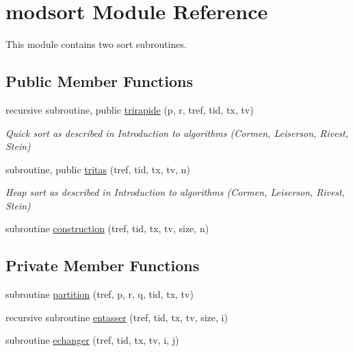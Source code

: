 \hypertarget{classmodsort}{\section{modsort Module Reference}
\label{classmodsort}
}


This module contains two sort subroutines.  


\subsection*{Public Member Functions}
\begin{DoxyCompactItemize}
\item 
recursive subroutine, public \hyperlink{classmodsort_a9c9ed3d1f948bf7023476506e298e0bf}{trirapide} (p, r, tref, tid, tx, tv)
\begin{DoxyCompactList}\small\item\em Quick sort as described in Introduction to algorithms (Cormen, Leiserson, Rivest, Stein) \end{DoxyCompactList}\item 
subroutine, public \hyperlink{classmodsort_a22712b17a572f1af3a89bb0247b6616c}{tritas} (tref, tid, tx, tv, n)
\begin{DoxyCompactList}\small\item\em Heap sort as described in Introduction to algorithms (Cormen, Leiserson, Rivest, Stein) \end{DoxyCompactList}\item 
subroutine \hyperlink{classmodsort_abdddab14c10da69038614dfbaf611056}{construction} (tref, tid, tx, tv, size, n)
\end{DoxyCompactItemize}
\subsection*{Private Member Functions}
\begin{DoxyCompactItemize}
\item 
subroutine \hyperlink{classmodsort_a86fab5cf7c126f47a3f7df3d93447784}{partition} (tref, p, r, q, tid, tx, tv)
\item 
recursive subroutine \hyperlink{classmodsort_a7cf26a2aded499f04cfddd9a93801356}{entasser} (tref, tid, tx, tv, size, i)
\item 
subroutine \hyperlink{classmodsort_aa2757c63708f71eb3b4a4446b4ba6c39}{echanger} (tref, tid, tx, tv, i, j)
\end{DoxyCompactItemize}



